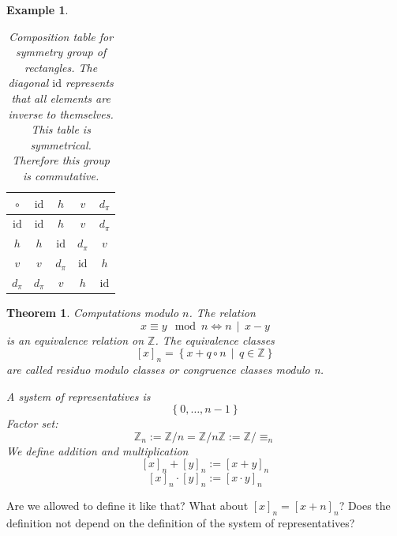 \documentclass[a4paper,landscape,twocolumn]{article}
\newcommand\set[1]{\left\{#1\right\}}
\newcommand\setdef[2]{\left\{#1\,\middle|\,#2\right\}}
\newcommand\divides[2]{#1\,\mid\,#2}
\newtheorem{theorem}{Theorem}
\newtheorem{ex}{Example}
\begin{document}
\begin{ex}
  \begin{table}[!ht]
    \begin{center}
      \begin{tabular}{c|cccc}
       \hline \hline
        $\circ     $ & $\text{id} $ & $h        $ & $v        $ & $d_\pi    $ \\
       \hline
        $\text{id} $ & $\text{id} $ & $h        $ & $v        $ & $d_\pi    $ \\
        $h         $ & $h         $ & $\text{id}$ & $d_\pi    $ & $v        $ \\
        $v         $ & $v         $ & $d_\pi    $ & $\text{id}$ & $h        $ \\
        $d_\pi     $ & $d_\pi     $ & $v        $ & $h        $ & $\text{id}$ \\
       \hline \hline
      \end{tabular}
      \caption{
        Composition table for symmetry group of rectangles.
        The diagonal $\text{id}$ represents that all elements are inverse to themselves.
        This table is symmetrical. Therefore this group is commutative.
      }
    \end{center}
  \end{table}
\end{ex}

\begin{theorem}
  \label{2.15}
  Computations modulo $n$. The relation
  \[ x \equiv y \mod{n} \Leftrightarrow \divides{n}{x - y} \]
  is an equivalence relation on $\mathbb{Z}$.
  The equivalence classes
  \[ [x]_n = \setdef{x + q \circ n}{q \in \mathbb{Z}} \]
  are called \emph{residuo modulo classes} or \emph{congruence classes modulo n}.

  A system of representatives is
  \[ \set{0, \ldots, n-1} \]
  Factor set:
  \[ \mathbb{Z}_n := \mathbb{Z}/n = \mathbb{Z}/n\mathbb{Z} := \mathbb{Z}/\equiv_n \]
  We define addition and multiplication
  \[ [x]_n + [y]_n := [x + y]_n \]
  \[ [x]_n \cdot [y]_n := [x \cdot y]_n \]
\end{theorem}

Are we allowed to define it like that?
What about $[x]_n = [x + n]_n$?
Does the definition not depend on the definition of the system of representatives?
\end{document}
